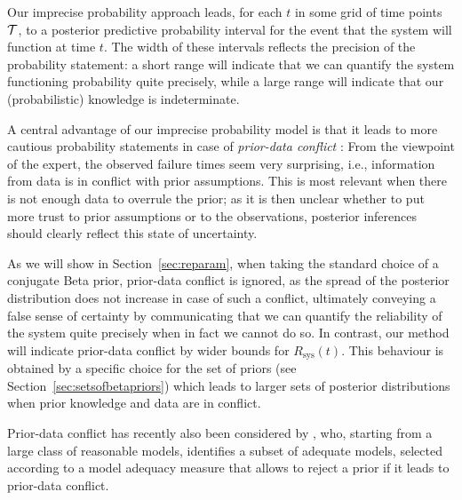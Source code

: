 \documentclass[12pt, a4paper]{elsarticle}
\newcommand{\Rsys}{R_\text{sys}}
\begin{document}
Our imprecise probability approach leads, for each $t$ in some grid of time points ${\cal T}$,
to a posterior predictive probability interval for the event that the system will function at time $t$.
The width of these intervals reflects the precision of the probability statement:
a short range will indicate that we can quantify the system functioning probability quite precisely,
while a large range will indicate that our (probabilistic) knowledge is indeterminate.

A central advantage of our imprecise probability model is
that it leads to more cautious probability statements
in case of \emph{prior-data conflict} \cite[see, e.g.,][]{2006:evans}:
From the viewpoint of the expert, the observed failure times seem very surprising,
i.e., information from data is in conflict with prior assumptions.
This is most relevant when there is not enough data to overrule the prior;
as it is then unclear whether to put more trust to prior assumptions or to the observations,
posterior inferences should clearly reflect this state of uncertainty.

As we will show in Section~\ref{sec:reparam}, when taking the standard choice of a conjugate Beta prior,
prior-data conflict is ignored, as the spread of the posterior distribution does not increase in case of such a conflict,
ultimately conveying a false sense of certainty
by communicating that we can quantify the reliability of the system quite precisely when in fact we cannot do so.
In contrast, our method will indicate prior-data conflict by wider bounds for $\Rsys(t)$.
This behaviour is obtained by a specific choice for the set of priors (see Section~\ref{sec:setsofbetapriors})
which leads to larger sets of posterior distributions when prior knowledge and data are in conflict.

Prior-data conflict has recently also been considered by \citet{2015:bickel},
who, starting from a large class of reasonable models,
identifies a subset of adequate models,
selected according to a model adequacy measure that allows to reject a prior if it leads to prior-data conflict.
\end{document}
